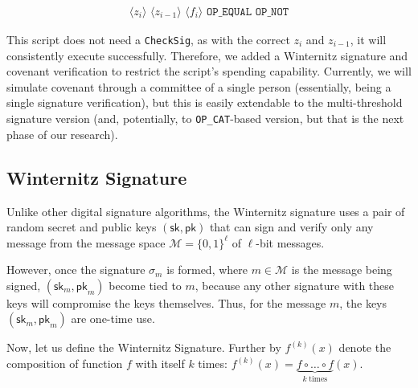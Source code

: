 \documentclass{iacrtrans}
\newcommand{\elem}[1]{\, \langle #1 \rangle \,}
\newcommand{\opcode}[1]{\, \texttt{#1} \,}
\begin{document}
\begin{empheqboxed}
\begin{align*}
    \elem{z_i} \elem{z_{i-1}} \elem{f_i} \opcode{OP\_EQUAL} \opcode{OP\_NOT}
\end{align*}
\end{empheqboxed}

This script does not need a \texttt{CheckSig}, as with the correct \(z_i\) and
\(z_{i-1}\), it will consistently execute successfully. Therefore, we added a
Winternitz signature and covenant verification to restrict the script's spending
capability. Currently, we will simulate covenant through a committee of a single
person (essentially, being a single signature verification), but this is easily
extendable to the multi-threshold signature version (and, potentially, to
\texttt{OP\_CAT}-based version, but that is the next phase of our research).

\subsection{Winternitz Signature}\label{sec:lamport-signature}

Unlike other digital signature algorithms, the Winternitz signature uses a pair
of random secret and public keys $(\mathsf{sk}, \mathsf{pk})$ that can sign and
verify only any message from the message space \(\mathcal{M} = {\{0,
1\}}^{\ell}\) of $\ell$-bit messages.

However, once the signature $\sigma_{m}$ is formed, where $m \in \mathcal{M}$ is
the message being signed, \((\mathsf{sk}_{m}, \mathsf{pk}_{m})\) become tied to
\(m\), because any other signature with these keys will compromise the keys
themselves. Thus, for the message \(m\), the keys \((\mathsf{sk}_{m},
\mathsf{pk}_{m})\) are one-time use.

Now, let us define the Winternitz Signature. Further by $f^{(k)}(x)$ denote the
composition of function $f$ with itself $k$ times: $f^{(k)}(x) = \underbrace{f
\circ \dots \circ f}_{k \; \text{times}}(x)$.
\end{document}
